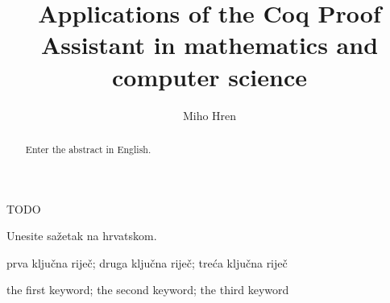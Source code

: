 \documentclass[diplomskirad, upload]{fer}
\title{Applications of the Coq Proof Assistant in mathematics and computer science}
\author{Miho Hren}
\begin{document}
\maketitle
{}

\begin{zahvale}
  TODO
\end{zahvale}

\mainmatter{}

\tableofcontents

\newcommand\misao[1]{\textcolor{red}{\textbf{Misao:} \textit{#1}}}







\nocite{*}


\begin{sazetak}
  Unesite sažetak na hrvatskom.
\end{sazetak}

\begin{kljucnerijeci}
  prva ključna riječ; druga ključna riječ; treća ključna riječ
\end{kljucnerijeci}

\begin{abstract}
  Enter the abstract in English.
\end{abstract}

\begin{keywords}
  the first keyword; the second keyword; the third keyword
\end{keywords}


\backmatter{}
\end{document}
